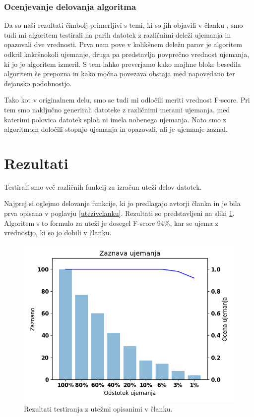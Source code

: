 \documentclass{acm_proc_article-sp}
\begin{document}
\subsubsection{Ocenjevanje delovanja algoritma}
Da so naši rezultati čimbolj primerljivi s temi, ki so jih objavili v članku \cite{fbhash}, smo tudi mi algoritem testirali na parih datotek z različnimi deleži ujemanja in opazovali dve vrednosti. Prva nam pove v kolikšnem deležu parov je algoritem odkril kakršnokoli ujemanje, druga pa predstavlja povprečno vrednost ujemanja, ki jo je algoritem izmeril. S tem lahko preverjamo kako majhne bloke besedila algoritem še prepozna in kako močna povezava obstaja med napovedano ter dejansko podobnostjo.

Tako kot v originalnem delu, smo se tudi mi odločili meriti vrednost F-score. Pri tem smo naključno generirali datoteke z različnimi merami ujemanja, med katerimi polovica datotek sploh ni imela nobenega ujemanja. Nato smo z algoritmom določili stopnjo ujemanja in opazovali, ali je ujemanje zaznal.

\section{Rezultati}
Testirali smo več različnih funkcij za izračun uteži delov datotek.

Najprej si oglejmo delovanje funkcije, ki jo predlagajo avtorji članka \cite{fbhash} in je bila prva opisana v poglavju \ref{utezivclanku}. Rezultati so predstavljeni na sliki \ref{fig:clanekUtezi}. Algoritem s to formulo za uteži je dosegel F-score 94\%, kar se ujema z vrednostjo, ki so jo dobili v članku.
\begin{figure}[htb]
\begin{center}
\includegraphics[width=1\columnwidth]{njihov_majhen.png}
\end{center}
\caption{\small{Rezultati testiranja z utežmi opisanimi v članku.}}
\label{fig:clanekUtezi}
\end{figure}
\end{document}
